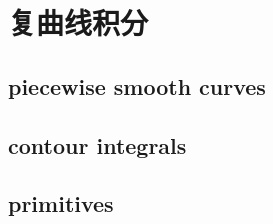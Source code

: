 \section{复曲线积分}
\label{b3:sec:0201}


\subsection{piecewise smooth curves}
\label{b3:subsec:020101}

\subsection{contour integrals}
\label{b3:subsec:020102}

\subsection{primitives}
\label{b3:subsec:020103}


